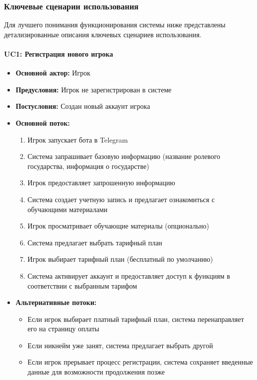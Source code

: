 \subsubsection{Ключевые сценарии использования}

Для лучшего понимания функционирования системы ниже представлены детализированные описания ключевых сценариев использования.

\paragraph{UC1: Регистрация нового игрока}

\begin{itemize}
    \item \textbf{Основной актор:} Игрок
    \item \textbf{Предусловия:} Игрок не зарегистрирован в системе
    \item \textbf{Постусловия:} Создан новый аккаунт игрока
    \item \textbf{Основной поток:}
    \begin{enumerate}
        \item Игрок запускает бота в Telegram
        \item Система запрашивает базовую информацию (название ролевого государства, информация о государстве)
        \item Игрок предоставляет запрошенную информацию
        \item Система создает учетную запись и предлагает ознакомиться с обучающими материалами
        \item Игрок просматривает обучающие материалы (опционально)
        \item Система предлагает выбрать тарифный план
        \item Игрок выбирает тарифный план (бесплатный по умолчанию)
        \item Система активирует аккаунт и предоставляет доступ к функциям в соответствии с выбранным тарифом
    \end{enumerate}
    \item \textbf{Альтернативные потоки:}
    \begin{itemize}
        \item Если игрок выбирает платный тарифный план, система перенаправляет его на страницу оплаты
        \item Если никнейм уже занят, система предлагает выбрать другой
        \item Если игрок прерывает процесс регистрации, система сохраняет введенные данные для возможности продолжения позже
    \end{itemize}
\end{itemize}

